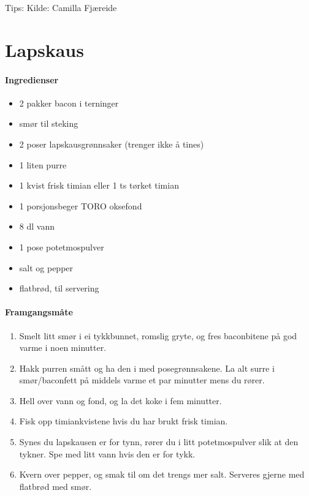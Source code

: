 \documentclass[12pt,a4paper]{book}
\begin{document}
Tips:
Kilde: Camilla Fjæreide
\clearpage{}
\clearpage{}\section{﻿Lapskaus}

\paragraph{Ingredienser}
\begin{itemize}[noitemsep]
	\item 2 pakker bacon i terninger
	\item smør til steking
	\item 2 poser lapskausgrønnsaker (trenger ikke å tines)
	\item 1 liten purre
	\item 1 kvist frisk timian eller 1 ts tørket timian
	\item 1 porsjonsbeger TORO oksefond
	\item 8 dl vann
	\item 1 pose potetmospulver
	\item salt og pepper
	\item flatbrød, til servering
\end{itemize}

\paragraph{Framgangsmåte}
\begin{enumerate}[noitemsep]
	\item Smelt litt smør i ei tykkbunnet, romslig gryte, og fres baconbitene på god varme i noen minutter.
	\item Hakk purren smått og ha den i med posegrønnsakene. La alt surre i smør/baconfett på middels varme et par minutter mens du rører.
	\item Hell over vann og fond, og la det koke i fem minutter.
	\item Fisk opp timiankvistene hvis du har brukt frisk timian.
	\item Synes du lapskausen er for tynn, rører du i litt potetmospulver slik at den tykner. Spe med litt vann hvis den er for tykk.
	\item Kvern over pepper, og smak til om det trengs mer salt. Serveres gjerne med flatbrød med smør.
\end{enumerate}
\end{document}

